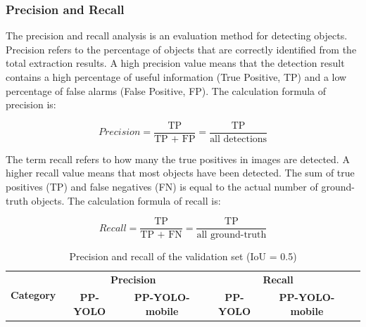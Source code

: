 \documentclass[sensors,article,submit,moreauthors,pdftex]{Definitions/mdpi}
\begin{document}
\begin{paracol}{2}
\subsubsection{Precision and Recall}

The precision and recall analysis is an evaluation method for detecting objects. Precision refers to the percentage of objects that are correctly identified from the total extraction results. A high precision value means that the detection result contains a high percentage of useful information (True Positive, TP) and a low percentage of false alarms (False Positive, FP). The calculation formula of precision is:


\begin{equation} 
Precision = \frac{\text{TP}}{\text{TP + FP} } = \frac{\text{TP}}{\text{all\ detections} }
\end{equation}

The term recall refers to how many the true positives in images are detected. A higher recall value means that most objects have been detected. The sum of true positives (TP) and false negatives (FN) is equal to the actual number of ground-truth objects. The calculation formula of recall is:

\begin{equation} 
Recall = \frac{\text{TP}}{\text{TP + FN} } = \frac{\text{TP}}{\text{all\ ground-truth} } 
\end{equation}

\begin{table}[htbp]
\centering
\caption{Precision and recall of the validation set (IoU = 0.5)}
\begin{tabular}{lccccc} 
\toprule

\multicolumn{1}{c}{\multirow{2}{*}{\textbf{Category}}} & \multicolumn{2}{c}{\textbf{Precision}}       & \multicolumn{2}{c}{\textbf{Recall}} \\
\cmidrule(l){2-5} 
\multicolumn{1}{c}{} & \textbf{PP-YOLO} & \textbf{PP-YOLO-mobile} & \textbf{PP-YOLO} & \textbf{PP-YOLO-mobile} \\


\end{tabular}
\end{table}
\end{paracol}
\end{document}
